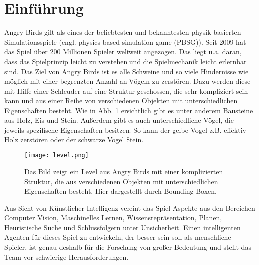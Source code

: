 \section{Einführung}
Angry Birds gilt als eines der beliebtesten und bekanntesten physik-basierten Simulationsspiele (engl. physics-based simulation game (PBSG)). Seit 2009 hat das Spiel über 200 Millionen Spieler weltweit angezogen. Das liegt u.a. daran, dass das Spielprinzip leicht zu verstehen und die Spielmechanik leicht erlernbar sind. Das Ziel von Angry Birds ist es alle Schweine und so viele Hindernisse wie möglich mit einer begrenzten Anzahl an Vögeln zu zerstören. Dazu werden diese mit Hilfe einer Schleuder auf eine Struktur geschossen, die sehr kompliziert sein kann und aus einer Reihe von verschiedenen Objekten mit unterschiedlichen Eigenschaften besteht. Wie in Abb. 1 ersichtlich gibt es unter anderem Bausteine aus Holz, Eis und Stein. Außerdem gibt es auch unterschiedliche Vögel, die jeweils spezifische Eigenschaften besitzen. So kann der gelbe Vogel z.B. effektiv Holz zerstören oder der schwarze Vogel Stein.

\begin{figure} [h]
\begin{center}
\texttt{[image: level.png]}
\caption{Das Bild zeigt ein Level aus Angry Birds mit einer komplizierten Struktur, die aus verschiedenen Objekten mit unterschiedlichen Eigenschaften besteht. Hier dargestellt durch Bounding-Boxen.}
\end{center}
\end{figure}

Aus Sicht von Künstlicher Intelligenz vereint das Spiel Aspekte aus den Bereichen Computer Vision, Maschinelles Lernen, Wissensrepräsentation, Planen, Heuristische Suche und Schlussfolgern unter Unsicherheit. Einen intelligenten Agenten für dieses Spiel zu entwickeln, der besser sein soll als menschliche Spieler, ist genau deshalb für die Forschung von großer Bedeutung und stellt das Team vor schwierige Herausforderungen.